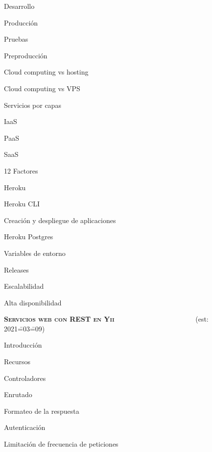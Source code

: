 \begin{longenum}
\begin{longenum}
\begin{longenum}
            \item Desarrollo
            \item Producción
            \item Pruebas
            \item Preproducción
        \end{longenum}
        \item Cloud computing vs hosting
        \item Cloud computing vs VPS
        \item Servicios por capas
        \begin{longenum}
            \item IaaS
            \item PaaS
            \item SaaS
        \end{longenum}
        \item 12 Factores 
        \item Heroku
        \begin{longenum}
            \item Heroku CLI
            \item Creación y despliegue de aplicaciones
            \item Heroku Postgres
            \item Variables de entorno
            \item Releases
        \end{longenum}
        \item Escalabilidad \opcional\
        \item Alta disponibilidad \opcional\
    \end{longenum}
    \item \textbf{\textsc{Servicios web con REST en Yii}} \ \ \ \ \ \ \ \ \ \ \ \ \ \ \ \ \ \ \ \ \ \ \ (est: 2021\==03\==09)
    \begin{longenum}
        \item Introducción
        \item Recursos
        \item Controladores
        \item Enrutado
        \item Formateo de la respuesta
        \item Autenticación
        \item Limitación de frecuencia de peticiones

\end{longenum}
\end{longenum}
